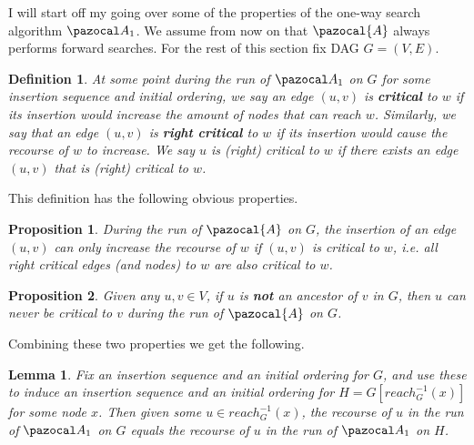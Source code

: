 \documentclass{report}
\newtheorem{lemma}{Lemma}
\newtheorem{proposition}{Proposition}
\newtheorem{definition}{Definition}
\begin{document}
I will start off my going over some of the properties of the one-way search algorithm $\pazocal A_1$. We assume from now on that $\pazocal{A}$ always performs forward searches. For the rest of this section fix DAG $G=(V,E)$.

\begin{definition}
At some point during the run of $\pazocal A_1$ on $G$ for some insertion sequence and initial ordering, we say an edge $(u,v)$ is \textbf{critical} to $w$ if its insertion would increase the amount of nodes that can reach $w$. Similarly, we say that an edge $(u,v)$ is \textbf{right critical} to $w$ if its insertion would cause the recourse of $w$ to increase. We say $u$ is (right) critical to $w$ if there exists an edge $(u,v)$ that is (right) critical to $w$.
\end{definition}

This definition has the following obvious properties.

\begin{proposition}
During the run of $\pazocal{A}$ on $G$, the insertion of an edge $(u,v)$ can only increase the recourse of $w$ if $(u,v)$ is critical to $w$, i.e. all right critical edges (and nodes) to $w$ are also critical to $w$.
\end{proposition}

\begin{proposition}
Given any $u,v \in V$, if $u$ is \textbf{not} an ancestor of $v$ in $G$, then $u$ can never be critical to $v$ during the run of $\pazocal{A}$ on $G$. 
\end{proposition}

Combining these two properties we get the following.

\begin{lemma}
Fix an insertion sequence and an initial ordering for $G$, and use these to induce an insertion sequence and an initial ordering for $H = G[reach^{-1}_{G}(x)]$ for some node $x$. Then given some $u \in reach^{-1}_{G}(x)$, the recourse of $u$ in the run of $\pazocal A_1$ on $G$ equals the recourse of $u$ in the run of $\pazocal A_1$ on $H$.
\end{lemma}
\end{document}
